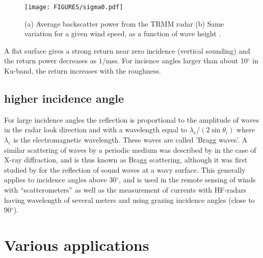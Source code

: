 \begin{figure}[htb]
\centerline{\texttt{[image: FIGURES/sigma0.pdf]}}
\caption[Radar return power in Ku-band as a function of wind speed, incidence angle and sea state]
{(a) Average backscatter power from the TRMM radar \citep[from][]{Freilich&Vanhoff2003} 
(b) Same variation for a given wind speed, as a function of wave height \citep[from][]{Nouguier&al.2016}. \label{fig:sigma0}}
\end{figure}




A flat surface gives a strong return near zero incidence (vertical sounding) and the return power decreases as $1/$mss. For incience angles 
larger than about 10$^\circ$ in Ku-band, the return increases with the roughness.


\subsection{higher incidence angle}
For large incidence angles the reflection is proportional to the amplitude of waves in the radar look direction and with a wavelength 
equal to $\lambda_e / (2 \sin \theta_i)$ where $\lambda_e$ is the electromagnetic wavelength. These waves are called 'Bragg waves'. A similar 
scattering of waves by a periodic medium was described by \cite{Bragg1913} in the case of X-ray diffraction, and is thus known as Bragg scattering, although it 
was first studied by \cite{Rayleigh1896} for the reflection of sound waves at a wavy surface. This generally applies to incidence angles above 30$^\circ$, and 
is used in the remote sensing of winds with ``scatterometers'' as well as the measurement of currents with HF-radars having wavelength of several meters and using 
grazing incidence angles (close to 90$^\circ$). 

\section{Various applications}
